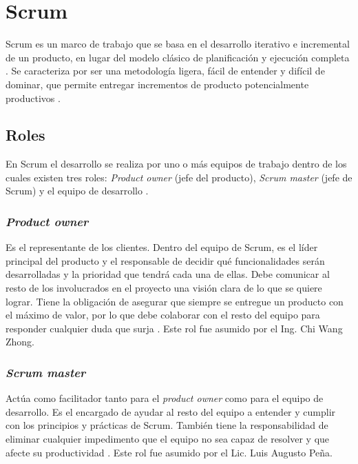 \section{Scrum} \label{sect:Scrum}

Scrum es un marco de trabajo que se basa en el desarrollo iterativo e incremental de un producto, en lugar del modelo clásico de planificación y ejecución completa \cite{SCRM0}.  Se caracteriza por ser una metodología ligera, fácil de entender y difícil de dominar, que permite entregar incrementos de producto potencialmente productivos \cite{SCRM1}. 

\subsection{Roles} 

En Scrum el desarrollo se realiza por uno o más equipos de trabajo dentro de los cuales existen tres roles: \textit{Product owner} (jefe del producto), \textit{Scrum master} (jefe de Scrum) y el equipo de desarrollo \cite{SCRM12}. 
 
\subsubsection{\textit{Product owner}}

Es el representante de los clientes. Dentro del equipo de Scrum, es el líder principal del producto y el responsable de decidir qué funcionalidades serán desarrolladas y la prioridad que tendrá cada una de ellas. Debe comunicar al resto de los involucrados en el proyecto una visión clara de lo que se quiere lograr. Tiene la obligación de asegurar que siempre se entregue un producto con el máximo de valor, por lo que debe colaborar con el resto del equipo para responder cualquier duda que surja \cite{SCRM12}. Este rol fue asumido por el Ing. Chi Wang Zhong.

\subsubsection{\textit{Scrum master}}

Actúa como facilitador tanto para el \textit{product owner} como para el equipo de desarrollo. Es el encargado de ayudar al resto del equipo a entender y cumplir con los principios y prácticas de Scrum. También tiene la responsabilidad de eliminar cualquier impedimento que el equipo no sea capaz de resolver y que afecte su productividad \cite{SCRM12}. Este rol fue asumido por el Lic. Luis Augusto Peña.


